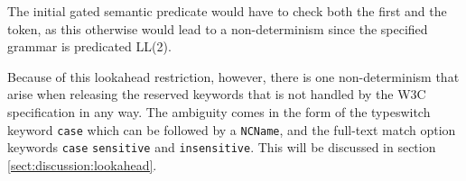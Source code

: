 The initial gated semantic predicate would have to check both the first and the token, as this otherwise would lead to a non-determinism since the specified grammar is predicated LL(2).

Because of this lookahead restriction, however, there is one non-determinism that arise when releasing the reserved keywords that is not handled by the W3C specification in any way. The ambiguity comes in the form of the typeswitch keyword \verb!case! which can be followed by a \verb!NCName!, and the full-text match option keywords \verb!case! \verb!sensitive! and \verb!insensitive!. This will be discussed in section \ref{sect:discussion:lookahead}.
